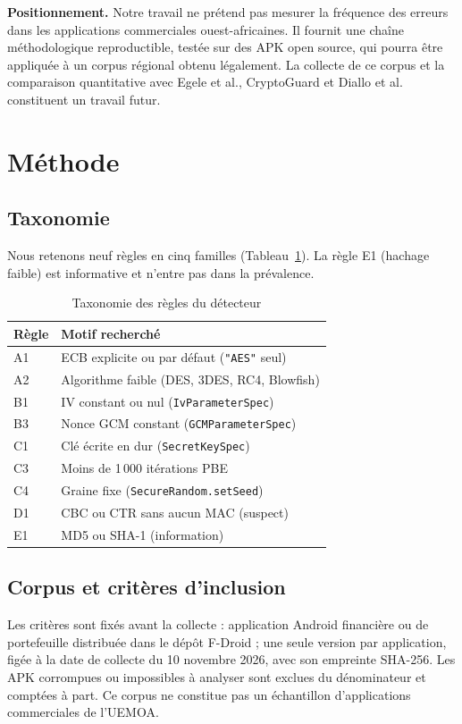 \documentclass[conference,a4paper]{IEEEtran}
\begin{document}
\textbf{Positionnement.} Notre travail ne prétend pas mesurer la fréquence des erreurs dans les applications commerciales ouest-africaines. Il fournit une chaîne méthodologique reproductible, testée sur des APK open source, qui pourra être appliquée à un corpus régional obtenu légalement. La collecte de ce corpus et la comparaison quantitative avec Egele et al., CryptoGuard et Diallo et al. constituent un travail futur.

\section{Méthode}

\subsection{Taxonomie}
Nous retenons neuf règles en cinq familles (Tableau~\ref{tab:taxo}). La règle E1 (hachage faible) est informative et n'entre pas dans la prévalence.

\begin{table}[t]
\caption{Taxonomie des règles du détecteur}
\label{tab:taxo}
\centering\small
\begin{tabular}{lp{5.6cm}}
\toprule
Règle & Motif recherché \\
\midrule
A1 & ECB explicite ou par défaut (\texttt{"AES"} seul) \\
A2 & Algorithme faible (DES, 3DES, RC4, Blowfish) \\
B1 & IV constant ou nul (\texttt{IvParameterSpec}) \\
B3 & Nonce GCM constant (\texttt{GCMParameterSpec}) \\
C1 & Clé écrite en dur (\texttt{SecretKeySpec}) \\
C3 & Moins de 1\,000 itérations PBE \\
C4 & Graine fixe (\texttt{SecureRandom.setSeed}) \\
D1 & CBC ou CTR sans aucun MAC (suspect) \\
E1 & MD5 ou SHA-1 (information) \\
\bottomrule
\end{tabular}
\end{table}

\subsection{Corpus et critères d'inclusion}
Les critères sont fixés avant la collecte : application Android financière ou de portefeuille distribuée dans le dépôt F-Droid ; une seule version par application, figée à la date de collecte du 10 novembre 2026, avec son empreinte SHA-256. Les APK corrompues ou impossibles à analyser sont exclues du dénominateur et comptées à part. Ce corpus ne constitue pas un échantillon d'applications commerciales de l'UEMOA.
\end{document}
